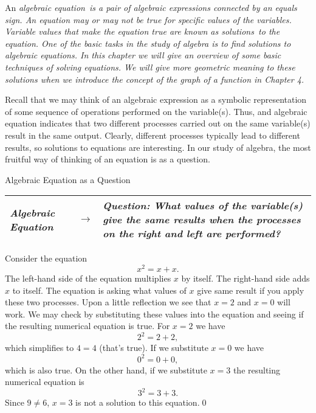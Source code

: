 An \it{algebraic equation}\normalfont\ is a pair of algebraic expressions connected by an equals sign. An equation may or may not be true for specific values of the variables. Variable values that make the equation true are known as \it{solutions}\ \normalfont to the equation. One of the basic tasks in the study of algebra is to find solutions to algebraic equations. In this chapter we will give an overview of some basic techniques of solving equations. We will give more geometric meaning to these solutions when we introduce the concept of the graph of a function in Chapter 4.
\par
Recall that we may think of an algebraic expression as a symbolic representation of some sequence of operations performed on the variable(s). Thus, and algebraic equation indicates that two different processes carried out on the same variable(s) result in the same output. Clearly, different processes typically lead to different results, so solutions to equations are interesting. In our study of algebra, the most fruitful way of thinking of an equation is as a question.

\begin{center}
Algebraic Equation as a Question 
\begin{tabular}{|p{1.5in} c p{3in} |}
\hline\hline \it{Algebraic Equation} & $\longrightarrow$ & \it{Question: What values of the variable(s) give the same results when the processes on the right and left are performed?}\normalfont\\
\hline
\end{tabular}
\end{center} 

\par

\begin{eg} Consider the equation
\[
x^2 = x+x.
\]
The left-hand side of the equation multiplies $x$ by itself. The right-hand side adds $x$ to itself. The equation is asking what values of $x$ give same result if you apply these two processes. Upon a little reflection we see that $x=2$ and $x=0$ will work. We may check by substituting these values into the equation and seeing if the resulting numerical equation is true. For $x=2$ we have
\[
2^2 = 2+2,
\]
which simplifies to $4=4$ (that's true). If we substitute $x=0$ we have
\[
0^2 = 0+0,
\]
which is also true. On the other hand, if we substitute $x=3$ the resulting numerical equation is
\[
3^2 = 3+3.
\]
Since $9\neq 6$, $x=3$ is not a solution to this equation.\qed \end{eg}

